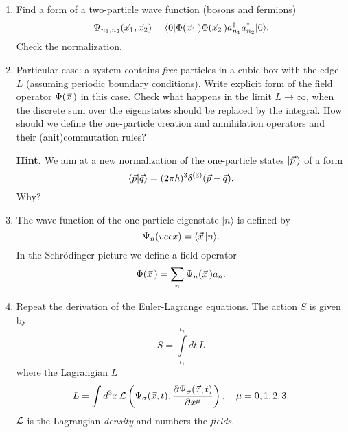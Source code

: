 \documentclass[a4paper,11pt]{article}
\begin{document}
\begin{enumerate}
\item Find a form of a two-particle wave function (bosons and fermions)
  \begin{equation}
    \label{eq:27}
    \Psi_{ n_{ 1 }, n_{ 2 } }( \vec{ x }_{ 1 }, \vec{ x }_{ 2 } ) =
    \langle 0 | \Phi( \vec{ x }_{ 1 } \, ) \Phi( \vec{ x }_{ 2 } \, )
    a_{ n_{ 1 } }^{ \dagger } a_{ n_{ 2 } }^{ \dagger } | 0 \rangle.
  \end{equation}
  Check the normalization.

\item Particular case: a system contains \textit{free} particles in a cubic box with the edge $L$ (assuming periodic boundary conditions). Write explicit form of the field operator $\Phi( \vec{ x } \, )$ in this case. Check what happens in the limit $L \to \infty$, when the discrete sum over the eigenstates should be replaced by the integral. How should we define the one-particle creation and annihilation operators and their (anit)commutation rules?

  \textbf{Hint.} We aim at a new normalization of the one-particle states $| \vec{ p } \, \rangle$ of a form
  \begin{equation}
    \label{eq:28}
    \langle \vec{ p } | \vec{ q } \rangle = ( 2\pi \hbar )^{ 3 } \delta^{ ( 3 ) }( \vec{ p } - \vec{ q } ).
  \end{equation}
  Why?

\item The wave function of the one-particle eigenstate $| n \rangle$ is defined by
  \begin{equation}
    \label{eq:20}
    \Psi_{ n }( vecx ) = \langle \vec{ x } \, | n \rangle.
  \end{equation}
  In the Schr\"{o}dinger picture we define a field operator
  \begin{equation}
    \label{eq:21}
    \Phi( \vec{ x } \, ) = \sum_{ n } \Psi_{ n }( \vec{ x } \, ) a_{ n }.
  \end{equation}

\item Repeat the derivation of the Euler-Lagrange equations. The
  action $S$ is given by
  \begin{equation}
    \label{eq:QM32}
    S = \int\limits_{ t_{ 1 } }^{ t_{ 2 } } dt \, L
  \end{equation}
  where the Lagrangian $L$
  \begin{equation}
    \label{eq:QM33}
    L =
    \int d^{ 3 } x \, \mathcal{L}\left( \Psi_{ \sigma }( \vec{ x }, t ),
      \frac{ \partial \Psi_{ \sigma }( \vec{ x }, t ) }{ \partial x^{ \mu } } \right), \quad
    \mu = 0, 1, 2, 3.
  \end{equation}
  $\mathcal{L}$ is the Lagrangian \textit{density} and numbers the
  \textit{fields}.


\end{enumerate}
\end{document}
